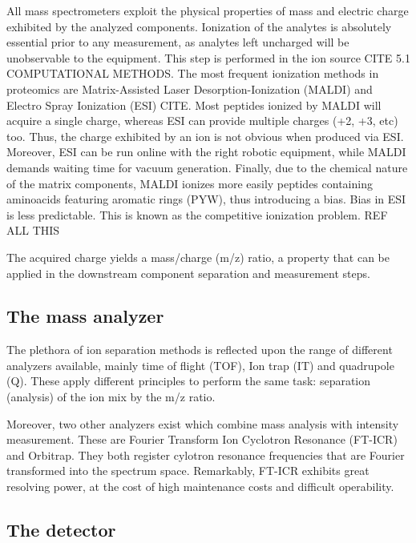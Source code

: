 \documentclass[11pt, a4paper]{report}
\begin{document}
All mass spectrometers exploit the physical properties of mass and electric charge exhibited by the analyzed components. Ionization of the analytes is absolutely essential prior to any measurement, as analytes left uncharged will be unobservable to the equipment.
This step is performed in the ion source \cite{Barsnes2008} CITE 5.1 COMPUTATIONAL METHODS. The most frequent ionization methods in proteomics are Matrix-Assisted Laser Desorption-Ionization (MALDI) and Electro Spray Ionization (ESI) CITE. Most peptides ionized by MALDI will acquire a single charge, whereas ESI can provide multiple charges (+2, +3, etc) too. Thus, the charge exhibited by an ion is not obvious when produced via ESI. Moreover, ESI can be run online with the right robotic equipment, while MALDI demands waiting time for vacuum generation. Finally, due to the chemical nature of the matrix components, MALDI ionizes more easily peptides containing aminoacids featuring aromatic rings (PYW), thus introducing a bias. Bias in ESI is less predictable. This is known as the competitive ionization problem. REF ALL THIS

The acquired charge yields a mass/charge (\ac{m/z}) ratio, a property that can be applied in the downstream component separation and measurement steps.

\subsection{The mass analyzer}
\label{subsec:the_mass_analyzer}

The plethora of ion separation methods is reflected upon the range of different analyzers available, mainly time of flight (\ac{TOF}), Ion trap (\ac{IT}) and quadrupole (\ac{Q}). These apply different principles to perform the same task: separation (analysis) of the ion mix by the \ac{m/z} ratio.

Moreover, two other analyzers exist which combine mass analysis with intensity measurement. These are Fourier Transform Ion Cyclotron Resonance (\ac{FT-ICR}) and Orbitrap. They both register cylotron resonance frequencies that are Fourier transformed into the spectrum space. Remarkably, \ac{FT-ICR} exhibits great resolving power, at the cost of high maintenance costs and difficult operability. 

\subsection{The detector}
\label{subsec:the_detector}
\end{document}
